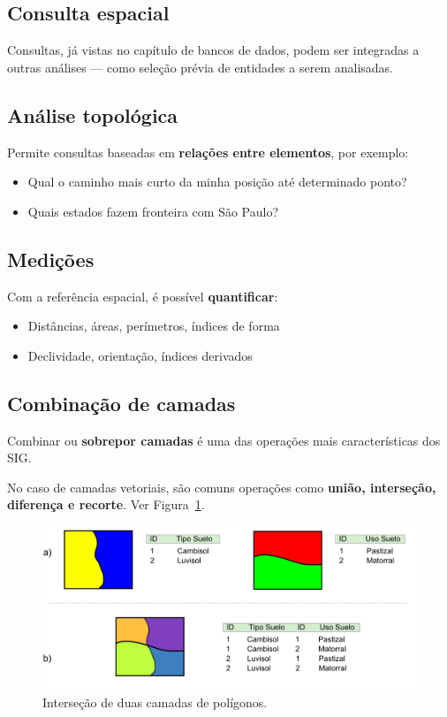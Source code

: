 \subsection{Consulta espacial}

Consultas, já vistas no capítulo de bancos de dados, podem ser integradas a outras análises — como seleção prévia de entidades a serem analisadas.

\subsection{Análise topológica}

Permite consultas baseadas em \textbf{relações entre elementos}, por exemplo:

\begin{itemize}
 \item Qual o caminho mais curto da minha posição até determinado ponto?
 \item Quais estados fazem fronteira com São Paulo?
\end{itemize}

\subsection{Medições}

Com a referência espacial, é possível \textbf{quantificar}:

\begin{itemize}
 \item Distâncias, áreas, perímetros, índices de forma
 \item Declividade, orientação, índices derivados
\end{itemize}

\subsection{Combinação de camadas}

Combinar ou \textbf{sobrepor camadas} é uma das operações mais características dos SIG.

No caso de camadas vetoriais, são comuns operações como \textbf{união, interseção, diferença e recorte}. Ver Figura~\ref{Fig:Interseccion}.

\begin{figure}[!hbt]   
\centering
\includegraphics[width= \columnwidth]{Analises/Interseccion.pdf}
\caption{\small Interseção de duas camadas de polígonos.}
\label{Fig:Interseccion} 
\end{figure}

